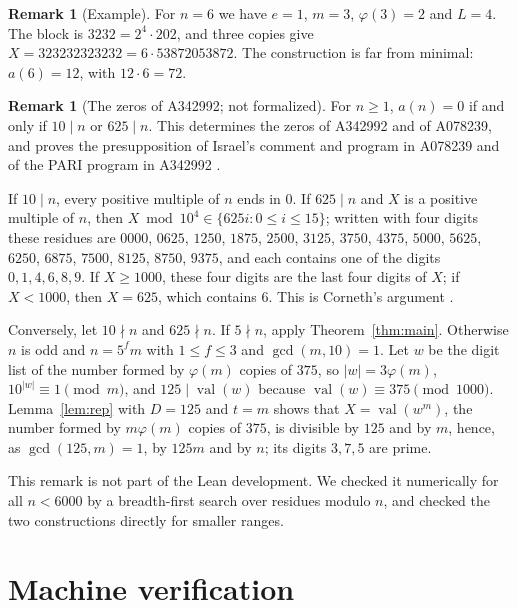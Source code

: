 \documentclass[11pt]{amsart}
\theoremstyle{plain}
\theoremstyle{definition}
\newtheorem{remark}[theorem]{Remark}
\newcommand{\val}{\operatorname{val}}
\begin{document}
\begin{remark}[Example]
For $n=6$ we have $e=1$, $m=3$, $\varphi(3)=2$ and $L=4$. The block is $3232=2^4\cdot202$, and three copies give $X=323232323232=6\cdot53872053872$. The construction is far from minimal: $a(6)=12$, with $12\cdot6=72$.
\end{remark}

\begin{remark}[The zeros of A342992; not formalized]\label{rem:zeros}
For $n\ge1$, $a(n)=0$ if and only if $10\mid n$ or $625\mid n$. This determines the zeros of A342992 and of A078239, and proves the presupposition of Israel's comment and program in A078239 \cite{A078239} and of the PARI program in A342992 \cite{A342992}.

If $10\mid n$, every positive multiple of $n$ ends in $0$. If $625\mid n$ and $X$ is a positive multiple of $n$, then $X\bmod 10^4\in\{625i:0\le i\le15\}$; written with four digits these residues are $0000$, $0625$, $1250$, $1875$, $2500$, $3125$, $3750$, $4375$, $5000$, $5625$, $6250$, $6875$, $7500$, $8125$, $8750$, $9375$, and each contains one of the digits $0,1,4,6,8,9$. If $X\ge1000$, these four digits are the last four digits of $X$; if $X<1000$, then $X=625$, which contains $6$. This is Corneth's argument \cite{A342992}.

Conversely, let $10\nmid n$ and $625\nmid n$. If $5\nmid n$, apply Theorem~\ref{thm:main}. Otherwise $n$ is odd and $n=5^fm$ with $1\le f\le3$ and $\gcd(m,10)=1$. Let $w$ be the digit list of the number formed by $\varphi(m)$ copies of $375$, so $|w|=3\varphi(m)$, $10^{|w|}\equiv1\pmod m$, and $125\mid\val(w)$ because $\val(w)\equiv375\pmod{1000}$. Lemma~\ref{lem:rep} with $D=125$ and $t=m$ shows that $X=\val(w^m)$, the number formed by $m\varphi(m)$ copies of $375$, is divisible by $125$ and by $m$, hence, as $\gcd(125,m)=1$, by $125m$ and by $n$; its digits $3,7,5$ are prime.

This remark is not part of the Lean development. We checked it numerically for all $n<6000$ by a breadth-first search over residues modulo $n$, and checked the two constructions directly for smaller ranges.
\end{remark}

\section{Machine verification}\label{sec:lean}
\end{document}
